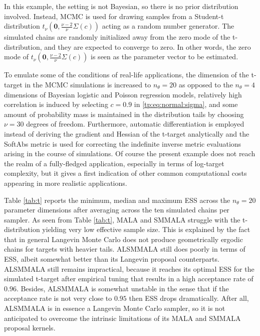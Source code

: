 \documentclass[twoside,11pt]{article}
\begin{document}
In this example, the setting is not Bayesian, so there is no prior distribution involved. Instead, MCMC is used for drawing
samples from a Student-t distribution $t_{\nu}(\mathbf{0},\frac{\nu-2}{\nu}\Sigma(c))$ acting as a random number generator. 
The simulated chains are randomly initialized away from the zero mode of the t-distribution, and they are expected to 
converge to zero. In other words, the zero mode of $t_{\nu}(\mathbf{0},\frac{\nu-2}{\nu}\Sigma(c))$ is seen as the parameter 
vector to be estimated.

To emulate some of the conditions of real-life applications, the dimension of the t-target in the MCMC simulations is 
increased to $n_{\theta}=20$ as opposed to the $n_{\theta}=4$ dimensions of Bayesian logistic and Poisson regression models, 
relatively high correlation is induced by selecting $c=0.9$ in \eqref{tp:eq:normal:sigma}, and some amount of probability 
mass is maintained in the distribution tails by choosing $\nu=30$ degrees of freedom. Furthermore, automatic differentiation 
is employed instead of deriving the gradient and Hessian of the t-target analytically and the SoftAbs metric is used for 
correcting the indefinite inverse metric evaluations arising in the course of simulations. Of course the present example does
not reach the realm of a fully-fledged application, especially in terms of log-target complexity, but it gives a first
indication of other common computational costs appearing in more realistic applications.

Table \ref{tab:t} reports the minimum, median and maximum ESS across the $n_{\theta}=20$ parameter dimensions after 
averaging across the ten simulated chains per sampler. As seen from Table \ref{tab:t}, MALA and SMMALA struggle with the 
t-distribution yielding very 
low effective sample size. This is explained by the fact that in general Langevin Monte Carlo does not produce geometrically
ergodic chains for targets with heavier tails. ALSMMALA still does poorly in terms of ESS, albeit somewhat better than its
Langevin proposal counterparts. ALSMMALA still remains impractical, because it reaches its optimal ESS for the simulated
t-target after empirical tuning that results in a high acceptance rate of $0.96$. Besides, ALSMMALA is somewhat unstable in 
the sense that if the acceptance rate is not very close to $0.95$ then ESS drops dramatically. After all, ALSMMALA is in
essence a Langevin Monte Carlo sampler, so it is not anticipated to overcome the intrinsic limitations of its MALA and SMMALA
proposal kernels.
\end{document}
